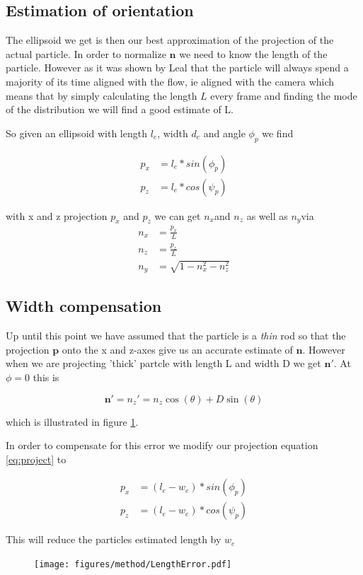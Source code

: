 \subsection{Estimation of orientation}

The ellipsoid we get is then our best approximation of the projection of the actual particle. In order to normalize $\mathbf{n}$ we need to know the length of the particle. However as it was shown by Leal that the particle will always spend a majority of its time aligned with the flow, ie aligned with the camera which means that by simply calculating the length $L$ every frame and finding the mode of the distribution we will find a good estimate of L. 

So given an ellipsoid with length $l_e$, width $d_e$ and angle $\phi_p$ we find 

\begin{align} \label{eq:project}
p_x  &= l_e*sin(\phi_p) \\
p_z  &= l_e*cos(\psi_p) 
\end{align}

with x and z projection $p_x$ and $p_z$ we can get $n_x$and $n_z$ as well as $n_y$via 
\begin{subequations}\label{eq:normalize}
\begin{align}
n_x 	&= \frac{p_x}{L} \\
n_z 	&= \frac{p_z}{L} \\
n_y		&= \sqrt{1 - n_x^2 - n_z^2}
\end{align}
\end{subequations}


\subsection{Width compensation}\label{sec:width_compensation}
Up until this point we have assumed that the particle is a \emph{thin} rod so that the projection $\mathbf{p}$ onto the x and z-axes give us an accurate estimate of $\mathbf{n}$. However when we are projecting 'thick' partcle with length L and width D we get $\mathbf{n}'$. At $\phi = 0$ this is

\begin{equation}
\mathbf{n}' = n_z' = n_z\cos(\theta)  + D\sin(\theta) 
\end{equation}

which is illustrated in figure \ref{fig:lengtherror}. 

In order to compensate for this error we modify our projection equation \ref{eq:project} to

\begin{align}\label{eq:widthCompensation}
p_x  &= (l_e - w_e)*sin(\phi_p) \\
p_z  &= (l_e - w_e)*cos(\psi_p) 
\end{align}

This will reduce the particles estimated length by $w_e$
\begin{figure}[H]
\centering
\texttt{[image: figures/method/LengthError.pdf]}
\caption{}\label{fig:lengtherror}
\end{figure} 

